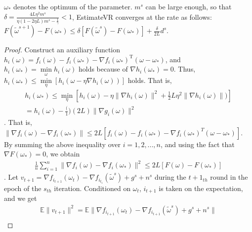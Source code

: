 \documentclass[letterpaper]{article}
\begin{document}
\begin{Lemma}
\label{lemma_converge}
$\omega_\ast$ denotes the optimum of the parameter.  $m^s$ can be large enough, so that $\delta = \frac{4 L \eta^2 m^s}{ \eta(1-2\eta L) m^s  -  \frac{1}{\gamma}    }     <1$, EstimateVR converges at the rate as follows:\\
$F(\tilde{\omega}^{s+1}) - F(\omega_\ast)  \le \delta [F(\tilde{\omega}^s)-F(\omega_\ast)]+\frac{\delta}{2L}d^s $.
\end{Lemma}
\begin{proof}
Construct an auxiliary function $h_i(\omega)=f_i(\omega)-f_i(\omega_\ast)-\nabla f_i(\omega_\ast)^\mathrm{T}(\omega-\omega_\ast)$, and $h_i(\omega_\ast)=\min\limits_\omega h_i(\omega)$ holds because of $\nabla h_i(\omega_\ast)=0$. Thus, $h_i(\omega_\ast)\le \min\limits_\eta [h_i(\omega-\eta \nabla h_i(\omega))]$ holds. That is,
\begin{equation}
\begin{array}{ll}
h_i(\omega_\ast)\le \min\limits_\eta [h_i(\omega)-\eta \parallel \nabla h_i(\omega) \parallel^2+\frac{1}{2} L \eta^2 \parallel  \nabla h_i(\omega)  \parallel  )] \\
=h_i(\omega)-\frac(1)(2L)\parallel  \nabla g_i(\omega) \parallel^2
\end{array} 
\end{equation}. That is, 
$\parallel   \nabla f_i(\omega)  - \nabla f_i(\omega_\ast)   \parallel \le 2L [ f_i(\omega)  -  f_i(\omega_\ast)  -\nabla f_i(\omega_\ast)^{T}(\omega-\omega_\ast)  ]$. By summing the above inequality over $i=1,2, ..., n$, and using the fact that $\nabla F(\omega_\ast)=0$, we obtain
\begin{equation}
\begin{array}{ll}
\frac{1}{n} \sum\limits_{i=1}^n \parallel  \nabla f_i(\omega)  - \nabla f_i(\omega_\ast)  \parallel^2  \le   2L [F(\omega)-F(\omega_\ast)] 
\end{array} 
\end{equation}. Let $v_{t+1}=\nabla f_{i_{t+1}}(\omega_{t}) - \nabla f_{i_{t_1}}(\tilde{\omega}^s)  + g^s+n^s$  during the $t+1_{th}$ round in the epoch of the $s_{th}$ iteration. Conditioned on $\omega_{t}$, $i_{t+1}$ is taken on the expectation, and we get 
\begin{equation}
\begin{array}{ll}
\mathbb{E}\parallel  v_{t+1} \parallel^2  = \mathbb{E} \parallel \nabla f_{i_{t+1}}(\omega_{t}) - \nabla f_{i_{t+1}}(\tilde{\omega}^s)  + g^s + n^s \parallel\\

\end{array}
\end{equation}
\end{proof}
\end{document}
